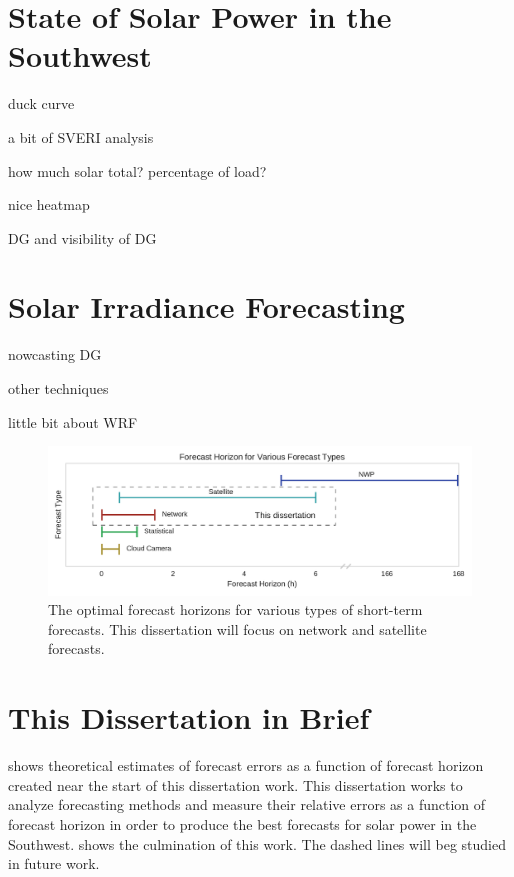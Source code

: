\section{State of Solar Power in the Southwest}
duck curve

a bit of SVERI analysis

how much solar total?
percentage of load?

nice heatmap

DG and visibility of DG


\section{Solar Irradiance Forecasting}
nowcasting DG

other techniques

little bit about WRF

\begin{figure}[h]
\includegraphics[width=\textwidth]{figs/fxhoriz.pdf}
\caption[Forecast horizon for various forecast types]{The optimal
  forecast horizons for various types of short-term forecasts. This
  dissertation will focus on network and satellite forecasts.}
\label{fig:fxhoriz}
\end{figure}


\section{This Dissertation in Brief}

 shows theoretical estimates of
forecast errors as a function of forecast horizon created near the
start of this dissertation work.
This dissertation works to analyze forecasting methods and measure
their relative errors as a function of forecast horizon in order to
produce the best forecasts for solar power in the Southwest.
 shows the culmination of this work.
The dashed lines will beg studied in future work.


